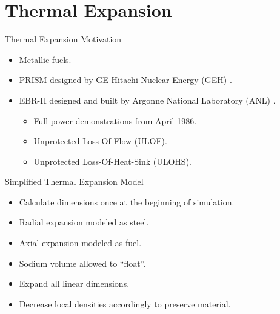 \section{Thermal Expansion}
\label{sec:thermalExpansion}

\begin{frame}{Thermal Expansion Motivation}
  \begin{itemize}
    \item Metallic fuels.
    \item PRISM designed by GE-Hitachi Nuclear Energy (GEH) \cite{GEFR793}.
    \item EBR-II designed and built by Argonne National Laboratory (ANL)
      \cite{PlentifulEnergy}.
      \begin{itemize}
        \item Full-power demonstrations from April 1986.
        \item Unprotected Loss-Of-Flow (ULOF).
        \item Unprotected Loss-Of-Heat-Sink (ULOHS).
      \end{itemize}
  \end{itemize}
\end{frame}

\begin{frame}{Simplified Thermal Expansion Model}
  \begin{itemize}
    \item Calculate dimensions once at the beginning of simulation.
    \item Radial expansion modeled as steel.
    \item Axial expansion modeled as fuel.
    \item Sodium volume allowed to ``float''.
    \item Expand all linear dimensions.
    \item Decrease local densities accordingly to preserve material.
  \end{itemize}
\end{frame}

